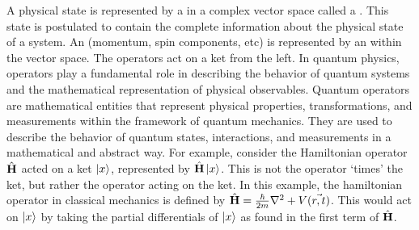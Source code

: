 A physical state is represented by a  in a complex vector space called a . This state is postulated to contain the complete information about the physical state of a system. An  (momentum, spin components, etc) is represented by an  within the vector space. The operators act on a ket from the left. In quantum physics, operators play a fundamental role in describing the behavior of quantum systems and the mathematical representation of physical observables. Quantum operators are mathematical entities that represent physical properties, transformations, and measurements within the framework of quantum mechanics. They are used to describe the behavior of quantum states, interactions, and measurements in a mathematical and abstract way. For example, consider the Hamiltonian operator $\hat{\text{\textbf{H}}}$ acted on a ket $\ket{x}$, represented by $\hat{\text{\textbf{H}}}\ket{x}$. This is not the operator `times' the ket, but rather the operator acting on the ket. In this example, the hamiltonian operator in classical mechanics is defined by $\hat{\text{\textbf{H}}} = \frac{\hbar}{2m}\nabla^2+V(\vec{r,t})$. This would act on $\ket{x}$ by taking the partial differentials of $\ket{x}$ as found in the first term of $\hat{\text{\textbf{H}}}$.












